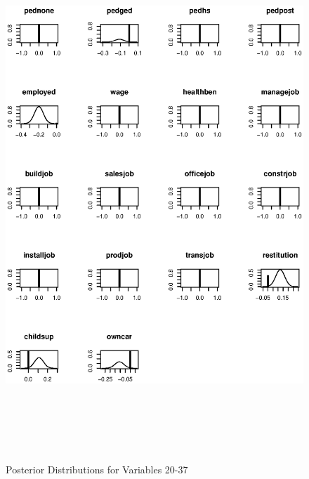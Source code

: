 \begin{figure}[t]
\begin{center}
\includegraphics[height=20cm,width=14.5cm]{graphapp032.eps}
\caption{Posterior Distributions for Variables 20-37}
\end{center}
\end{figure}



